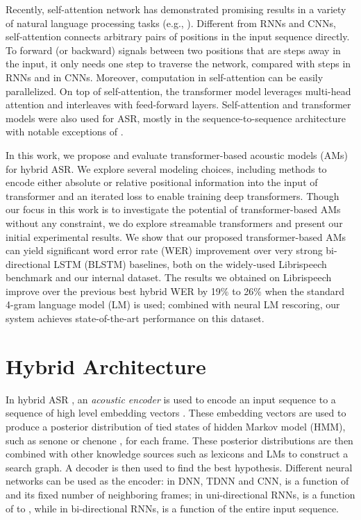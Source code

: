 \documentclass{article}
\begin{document}
Recently, self-attention network \cite{vaswani2017attention} has demonstrated promising results in a variety of natural language processing tasks (e.g., \cite{vaswani2017attention, devlin2018bert, radford2018improving}). Different from RNNs and CNNs, self-attention connects arbitrary pairs of positions in the input sequence directly. To forward (or backward) signals between two positions that are  steps away in the input, it only needs one step to traverse the network, compared with  steps in RNNs and  in CNNs. Moreover, computation in self-attention can be easily parallelized.  On top of self-attention, the transformer model \cite{vaswani2017attention} leverages multi-head attention and interleaves with feed-forward layers. Self-attention and transformer models were also used for ASR, mostly in the sequence-to-sequence architecture \cite{dong2018speech, sperber2018self,zhou2018syllable} with notable exceptions of \cite{povey2018time, salazar2019self}. 

In this work, we propose and evaluate transformer-based acoustic models (AMs) for hybrid ASR. We explore several modeling choices, including methods to encode either absolute or relative positional information into the input of transformer and an iterated loss to enable training deep transformers. Though our focus in this work is to investigate the potential of transformer-based AMs without any constraint, we do explore streamable transformers and present our initial experimental results. We show that our proposed transformer-based AMs can yield significant word error rate (WER) improvement over very strong bi-directional LSTM (BLSTM) baselines, both on the widely-used Librispeech benchmark and our internal dataset. The results we obtained on Librispeech improve over the previous best hybrid WER by 19\% to 26\% when the standard 4-gram language model (LM) is used; combined with neural LM rescoring, our system achieves state-of-the-art performance on this dataset.





\section{Hybrid  Architecture}
\label{sec:hybrid}
In hybrid ASR \cite{bourlard2012connectionist}, an \emph{acoustic encoder} is used to encode an input sequence  to a sequence of high level embedding vectors . These embedding vectors are used to produce a posterior distribution of tied states of hidden Markov model (HMM), such as senone \cite{hwang1992subphonetic} or chenone \cite{le2019senones}, for each frame. These posterior distributions are then combined with other knowledge sources such as lexicons and LMs to construct a search graph. A decoder is then used to find the best hypothesis. Different neural networks can be used as the encoder: in DNN, TDNN and CNN,  is a function of  and its fixed number of neighboring frames; in uni-directional RNNs,  is a function of  to , while in bi-directional RNNs,  is a function of the entire input sequence. 
\end{document}
